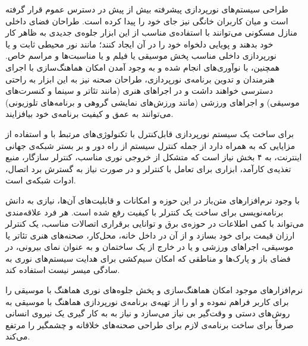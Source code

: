 
طراحی سیستم‌های نورپردازی پیشرفته بیش از پیش در دسترس عموم قرار گرفته است و میان کاربران خانگی نیز جای خود را پیدا کرده است. طراحان فضای داخلی منازل مسکونی می‌توانند با استفاده‌ی مناسب از این ابزار جلوه‌ی جدیدی به ظاهر کار خود بدهند و پویایی دلخواه خود را در آن ایجاد کنند؛ مانند نور محیطی ثابت و یا نورپردازی داخلی مناسب پخش موسیقی یا فیلم و یا مناسبت‌ها و مراسم خاص. همچنین، با نوآوری‌های انجام شده و به وجود آمدن امکان هماهنگ‌سازی با اجرای هنرمندان و تدوین برنامه‌ی نورپردازی، طراحان صحنه نیز به این ابزار به راحتی دسترسی خواهند داشت و در اجراهای هنری (مانند تئاتر و سینما و کنسرت‌های موسیقی) و اجراهای ورزشی (مانند ورزش‌های نمایشی گروهی و برنامه‌های تلوزیونی) می‌توانند به عمق و کیفیت برنامه‌ی خود بیافزایند.

برای ساخت یک سیستم نورپردازی قابل‌کنترل با تکنولوژی‌های مرتبط با  و استفاده از مزایایی که به همراه دارد از جمله کنترل سیستم از راه دور و بر بستر شبکه‌ی جهانی اینترنت، به ۴ بخش نیاز است که متشکل از خروجی نوری مناسب، کنترلر سازگار، منبع تغذیه‌ی کارآمد، ابزاری برای تعامل با کنترلر و در صورت نیاز به گسترش برد اتصال، ادوات شبکه‌ی  است.

با وجود نرم‌افزارهای متن‌باز در این حوزه و امکانات و قابلیت‌های آن‌ها، نیازی به دانش برنامه‌نویسی برای ساخت یک کنترلر با کیفیت رفع شده است. هر فرد علاقه‌مندی می‌تواند با کمی اطلاعات در حوزه‌ی برق و توانایی برقراری اتصالات مناسب،‌ یک کنترلر ارزان قیمت برای خود بسازد و از آن در داخل خانه، محل‌کار، صحنه‌های هنری تئاتر یا موسیقی، اجراهای ورزشی و یا در خارج از یک ساختمان و به عنوان نمای بیرونی، در فضای باز و پارک‌ها و مناطقی که امکان سیم‌کشی برای هدایت سیستم‌های نوری به سادگی میسر نیست استفاده کند.

نرم‌افزارهای موجود امکان هماهنگ‌سازی و پخش جلوه‌های نوری هماهنگ با موسیقی را برای کاربر فراهم نموده و او را از تهیه‌ی برنامه‌ی نورپردازی هماهنگ با موسیقی به روش‌های دستی و وقت‌گیر بی نیاز می‌سازد و نیاز به به کار گیری یک نیروی انسانی صرفاً برای ساخت برنامه‌ی لازم برای طراحی صحنه‌های خلاقانه و چشمگیر را مرتفع می‌کند.
